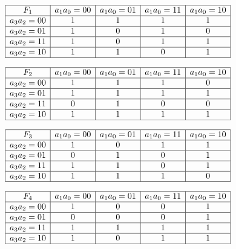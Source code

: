\begin{center}
$\begin{array}{|c|c|c|c|c|}
\hline
F_1 & a_1a_0=00 & a_1a_0=01 & a_1a_0=11 & a_1a_0=10 \\
\hline
a_3a_2=00  & 1   &  1  &  1  &  1  \\
\hline
a_3a_2=01  &  1  &  0  & 1   & 0   \\
\hline
a_3a_2=11  &   1 & 0   & 1   & 1   \\
\hline
a_3a_2=10  &  1  & 1   & 0   & 1   \\
\hline
\end{array}$
\end{center}

\begin{center}
$\begin{array}{|c|c|c|c|c|}
\hline
F_2 & a_1a_0=00 & a_1a_0=01 & a_1a_0=11 & a_1a_0=10 \\
\hline
a_3a_2=00  &  1  & 1   & 1   &  0  \\
\hline
a_3a_2=01  &  1  &  1  &  1  &  1  \\
\hline
a_3a_2=11  &  0  & 1   & 0   &  0  \\
\hline
a_3a_2=10  &  1  &  1  &  1  & 1   \\
\hline
\end{array}$
\end{center}

\begin{center}
$\begin{array}{|c|c|c|c|c|}
\hline
F_3 & a_1a_0=00 & a_1a_0=01 & a_1a_0=11 & a_1a_0=10 \\
\hline
a_3a_2=00  &  1  &  0  &  1  &   1 \\
\hline
a_3a_2=01  &  0  &  1  &  0  &  1  \\
\hline
a_3a_2=11  &  1  &  1  &  0  &  1  \\
\hline
a_3a_2=10  &  1  & 1   &  1  & 0   \\
\hline
\end{array}$
\end{center}

\begin{center}
$\begin{array}{|c|c|c|c|c|}
\hline
F_4 & a_1a_0=00 & a_1a_0=01 & a_1a_0=11 & a_1a_0=10 \\
\hline
a_3a_2=00  &  1  &  0  &  0  &  1  \\
\hline
a_3a_2=01  &   0 &  0  &  0  &  1  \\
\hline
a_3a_2=11  &  1  &  1  &  1  &  1  \\
\hline
a_3a_2=10  & 1   &  0  &  1  & 1   \\
\hline
\end{array}$
\end{center}


